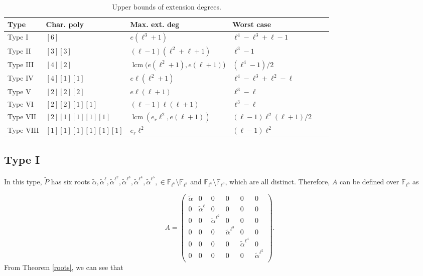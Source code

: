 \documentclass[11pt,a4paper]{article}
\theoremstyle{plain}
\theoremstyle{definition}
\theoremstyle{remark}
\DeclareMathOperator{\lcm}{lcm}
\begin{document}
\begin{center}
\begin{table}
\begin{tabular}{llllll} 
\toprule
Type& Char. poly & Max. ext. deg  & Worst case &  &  \\ \midrule
\addlinespace[0.5em]
Type I&$[6]$ & $e(\ell^3+1)$ & $\ell^4 - \ell^3 + \ell - 1$ &  \\
\addlinespace[0.5em]
Type II&$[3][3]$ & $(\ell-1)(\ell^2+\ell+1) $ & $\ell^3-1$ &  \\
\addlinespace[0.5em]
Type III&$[4][2]$ &  $ \lcm(e(\ell^2+1),e(\ell+1)$)& $(\ell^4-1)/2$ \\
\addlinespace[0.5em]
Type IV&$[4][1][1]$ & $e\ell(\ell^2+1)$& $\ell^4-\ell^3+\ell^2-\ell$\\
Type V&$[2][2][2]$ & $e \ell(\ell+1)$ &  $\ell^3-\ell$  &  \\
Type VI&$[2][2][1][1]$ & $(\ell-1) \ell(\ell+1)$  & $\ell^3-\ell$  &  \\
Type VII&$[2][1][1][1][1]$ & $\lcm(e_r\ell^2,e(\ell+1))$  & $(\ell-1)\ell^2(\ell+1)/2$  &  \\
Type VIII&$[1][1][1][1][1][1]$ & $e_r\ell^2$ & $(\ell-1)\ell^2$  &  \\
\bottomrule
\end{tabular} 
\caption{ Upper bounds of extension degrees.}\label{tabla2}
\end{table}
\end{center}

\subsection*{Type I}
In this type, \(\tilde{P}\) has six roots
\(\tilde{\alpha}, \tilde{\alpha}^\ell, \tilde{\alpha}^{\ell^2}, \tilde{\alpha}^{\ell^3}, \tilde{\alpha}^{\ell^4}, \tilde{\alpha}^{\ell^5}, \in \mathbb{F}_{\ell^6} \setminus \mathbb{F}_{\ell^2}\) and \(\mathbb{F}_{\ell^6} \setminus \mathbb{F}_{\ell^3}\),
which are all distinct.  
Therefore, \(A\) can be defined over \(\mathbb{F}_{\ell^6}\) as

\[
A =
\begin{pmatrix}
\tilde{\alpha} & 0 & 0 & 0 & 0 & 0\\
0 & \tilde{\alpha}^\ell & 0 & 0 & 0 & 0\\
0 & 0 & \tilde{\alpha}^{\ell^2} & 0 & 0 & 0\\
0 & 0 & 0 & \tilde{\alpha}^{\ell^3} & 0 & 0\\
0 & 0 & 0 & 0 & \tilde{\alpha}^{\ell^4} & 0\\
0 & 0 & 0 & 0 & 0 & \tilde{\alpha}^{\ell^5} \\
\end{pmatrix}.
\]
From Theorem \ref{roots}, we can see that
\end{document}
